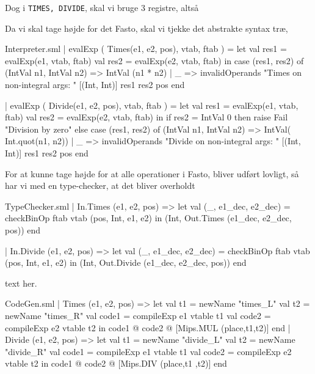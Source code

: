 \documentclass[11pt,a4paper,oneside]{report}
\begin{document}
Dog i \texttt{TIMES, DIVIDE}, skal vi bruge 3 registre, altså


Da vi skal tage højde for det Fasto, skal vi tjekke det abstrakte syntax træ,

\begin{code}[firstnumber=160]{Interpreter.sml}
| evalExp ( Times(e1, e2, pos), vtab, ftab ) =
    let
      val res1   = evalExp(e1, vtab, ftab)
      val res2   = evalExp(e2, vtab, ftab)
    in
      case (res1, res2) of
          (IntVal n1, IntVal n2) => IntVal (n1 * n2)
        | _ => invalidOperands
            "Times on non-integral args: "
                [(Int, Int)] res1 res2 pos
    end

| evalExp ( Divide(e1, e2, pos), vtab, ftab ) =
    let
      val res1   = evalExp(e1, vtab, ftab)
      val res2   = evalExp(e2, vtab, ftab)
    in
      if res2 = IntVal 0 then raise Fail "Division by zero"
        else
          case (res1, res2) of
            (IntVal n1, IntVal n2) => IntVal( Int.quot(n1, n2))
            | _ => invalidOperands
                "Divide on non-integral args: "
                    [(Int, Int)] res1 res2 pos
    end
\end{code}

For at kunne tage højde for at alle operationer i Fasto, bliver udført lovligt, så har vi med en type-checker, at det bliver overholdt

\begin{code}[firstnumber=160]{TypeChecker.sml}
| In.Times (e1, e2, pos)
  => let val (_, e1_dec, e2_dec) =
            checkBinOp ftab vtab (pos, Int, e1, e2)
     in (Int,
         Out.Times (e1_dec, e2_dec, pos))
     end

| In.Divide (e1, e2, pos)
  => let val (_, e1_dec, e2_dec) =
            checkBinOp ftab vtab (pos, Int, e1, e2)
     in (Int,
         Out.Divide (e1_dec, e2_dec, pos))
     end
\end{code}

text her.

\newpage

\begin{code}[firstnumber=133]{CodeGen.sml}
  | Times (e1, e2, pos) =>
      let val t1 = newName "times_L"
          val t2 = newName "times_R"
          val code1 = compileExp e1 vtable t1
          val code2 = compileExp e2 vtable t2
      in  code1 @ code2 @ [Mips.MUL (place,t1,t2)]
      end
  | Divide (e1, e2, pos) =>
      let val t1 = newName "divide_L"
          val t2 = newName "divide_R"
          val code1 = compileExp e1 vtable t1
          val code2 = compileExp e2 vtable t2
      in  code1 @ code2 @ [Mips.DIV (place,t1 ,t2)]
      end
\end{code}
\end{document}
